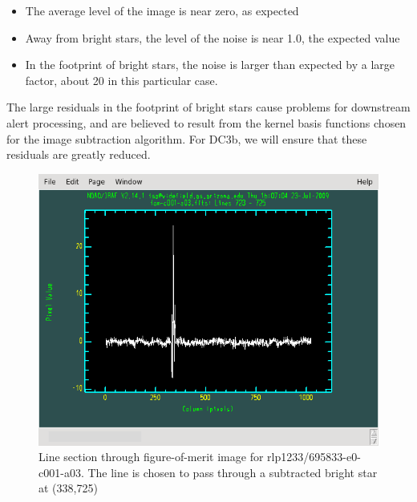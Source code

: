 \begin{itemize}
\item The average level of the image is near zero, as expected
\item Away from bright stars, the level of the noise is near 1.0, the
  expected value
\item In the footprint of bright stars, the noise is larger than
  expected by a large factor, about 20 in this particular case.
\end{itemize}  

The large residuals in the footprint of bright stars cause problems
for downstream alert processing, and are believed to result from the
kernel basis functions chosen for the image subtraction algorithm.
For DC3b, we will ensure that these residuals are greatly reduced.

\begin{figure}[hb]
\begin{center}
\includegraphics{images/rlp1233_v695833-e0-c001-a03-fom_plot.png}
\caption{Line section through figure-of-merit image for
  rlp1233/695833-e0-c001-a03.  The line is chosen to pass through a
  subtracted bright star at (338,725)}
\label{Figure 1}
\end{center}
\end{figure}

